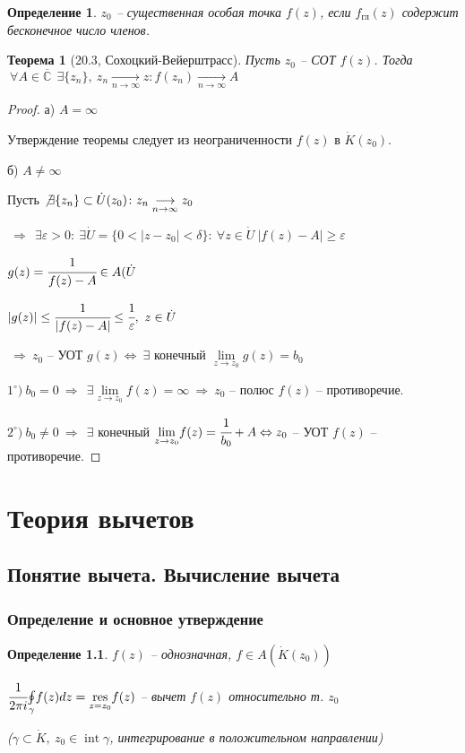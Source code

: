 \documentclass[final]{report}
\newcommand{\res}{\mathop{\mathrm{res}}\nolimits}
\newcommand{\then}{\ \Rightarrow\ }
\renewcommand{\C}{\mathbb{C}}
\newcommand{\moint}[1]{\underset{#1}{\oint}}
\newcommand{\mlim}[1]{\underset{#1}{\lim}}
\newcommand{\mres}[1]{\underset{#1}{\res}}
\newcommand{\LRA}{\Leftrightarrow}
\renewcommand{\bar}{\overline}
\newcommand{\Int}{\mathop{\mathrm{int}}\nolimits}
\newcommand{\g}{\gamma}
\newcommand{\e}{\varepsilon}
\newcommand{\E}{\ \exists}
\newcommand{\F}{\ \forall}
\newcommand{\CC}{\bar{\C}}
\newcommand{\opr}[1]{\begin{opred}#1\end{opred}}
\newcommand{\lra}[1]{\underset{#1}{\longrightarrow}}
\newtheorem*{theor}{Теорема}
\newtheorem*{opred}{Определение}
\theoremstyle{remark}
\begin{document}
\opr{$z_0$ -- существенная особая точка $f(z)$, если $f_{\mbox{гл}}(z)$ содержит бесконечное число членов.}

\begin{theor}[20.3, Сохоцкий-Вейерштрасс]
Пусть $z_0$ -- СОТ $f(z)$. Тогда $\F A\in\CC\ \E\{z_n\},\ z_n\lra{n\to\infty}z\colon f(z_n)\lra{n\to\infty}A$
\end{theor}
\begin{proof}
а) $A=\infty$

Утверждение теоремы следует из неограниченности $f(z)$ в $\dot{K}(z_0)$.

б) $A\neq\infty$

Пусть $\not\exists\{z_n\}\subset \dot{U}(z_0)\colon z_n\lra{n\to\infty}z_0$

$\then \E \e>0\colon\E \dot{U}=\{0<|z-z_0|<\delta\}\colon\F z\in \dot{U}\ |f(z)-A|\geq \e$

$g(z)=\cfrac1{f(z)-A}\in A(\dot{U}$

$|g(z)|\leq\cfrac1{|f(z)-A|}\leq\cfrac1\e,\ z\in\dot{U}$

$\then z_0$ -- УОТ $g(z) \LRA \E$ конечный $\mlim{z\to z_0}g(z)=b_0$

$1^\circ)\ b_0=0\then \E\mlim{z\to z_0}f(z)=\infty\then z_0$ -- полюс $f(z)$ -- противоречие.

$2^\circ)\ b_0\neq0\then\E$ конечный $\mlim{z\to z_0}f(z)=\cfrac1{b_0}+A \LRA z_0$ -- УОТ $f(z)$ -- противоречие.
\end{proof}

\chapter{Теория вычетов}


\section{Понятие вычета. Вычисление вычета}

\subsection{Определение и основное утверждение}

\opr{$f(z)$ -- однозначная, $f\in A(\dot{K}(z_0))$

$\cfrac1{2\pi i}\moint{\g}f(z)dz=\mres{z=z_0}f(z)$ -- вычет $f(z)$ относительно т. $z_0$

($\g\subset\dot{K},\ z_0\in\Int\g$, интегрирование в положительном направлении)}
\end{document}
